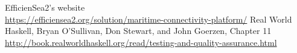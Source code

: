 \begin{thebibliography}{1}
		EfficienSea2's website\\
		\url{https://efficiensea2.org/solution/maritime-connectivity-platform/}
		Real World Haskell,
		Bryan O'Sullivan, Don Stewart, and John Goerzen,
		Chapter 11\\
		\url{http://book.realworldhaskell.org/read/testing-and-quality-assurance.html}
\end{thebibliography}